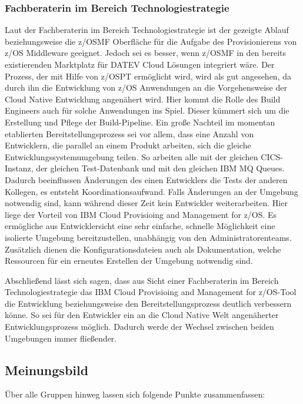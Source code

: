 \subsubsection{Fachberaterin im Bereich Technologiestrategie}
Laut der Fachberaterin im Bereich Technologiestrategie ist der gezeigte Ablauf beziehungsweise die z/OSMF Oberfläche für die Aufgabe des Provisionierens von z/OS Middleware geeignet.
Jedoch sei es besser, wenn z/OSMF in den bereits existierenden \glqq Marktplatz\grqq{} für DATEV Cloud Lösungen integriert wäre.
Der Prozess, der mit Hilfe von z/OSPT ermöglicht wird, wird als gut angesehen, da durch ihn die Entwicklung von z/OS Anwendungen an die Vorgehensweise der Cloud Native Entwicklung angenähert wird.
Hier kommt die Rolle des Build Engineers auch für solche Anwendungen ins Spiel.
Dieser kümmert sich um die Erstellung und Pflege der Build-Pipeline.
Ein große Nachteil im momentan etablierten Bereitstellungsprozess sei vor allem,  dass eine Anzahl von Entwicklern, die parallel an einem Produkt arbeiten, sich die gleiche Entwicklungssystemumgebung teilen.
So arbeiten alle mit der gleichen CICS-Instanz, der gleichen Test-Datenbank und mit den gleichen IBM MQ Queues.
Dadurch beeinflussen Änderungen des einen Entwicklers die Tests der anderen Kollegen, es entsteht Koordinationsaufwand.
Falls Änderungen an der Umgebung notwendig sind, kann während dieser Zeit kein Entwickler weiterarbeiten.
Hier liege der Vorteil von \glqq IBM Cloud Provisioing and Management for z/OS\grqq.
Es ermögliche aus Entwicklersicht eine sehr einfache, schnelle Möglichkeit eine isolierte Umgebung bereitzustellen, unabhängig von den Administratorenteams.
Zusätzlich dienen die Konfigurationsdateien auch als Dokumentation, welche Ressourcen für ein erneutes Erstellen der Umgebung notwendig sind.

Abschließend lässt sich sagen, dass aus Sicht einer Fachberaterin im Bereich Technologiestrategie das \glqq IBM Cloud Provisioing and Management for z/OS\grqq-Tool die Entwicklung beziehungsweise den Bereitstellungsprozess deutlich verbessern könne.
So sei für den Entwickler ein an die Cloud Native Welt angenäherter Entwicklungsprozess möglich.
Dadurch werde der Wechsel zwischen beiden Umgebungen immer fließender.

\subsection{Meinungsbild}
Über alle Gruppen hinweg lassen sich folgende Punkte zusammenfassen:

